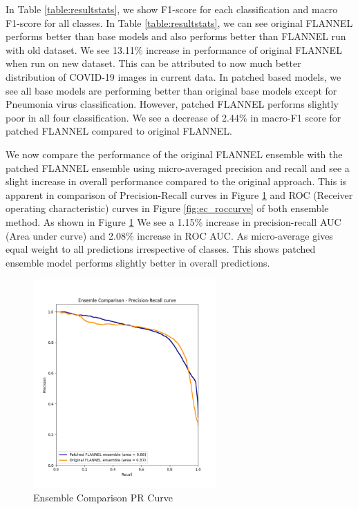 \documentclass{sigkddExp}
\begin{document}
In Table \ref{table:resultstats}, we show F1-score for each classification
and macro F1-score for all classes. In Table \ref{table:resultstats}, we can see
original FLANNEL performs better than base models and also performs better than
FLANNEL run with old dataset\cite{10.1093/jamia/ocaa280}. We see 13.11\% increase in performance of original
FLANNEL when run on new dataset. This can be attributed to now much better distribution
of COVID-19 images in current data. In patched based models, we see all base models
are performing better than original base models except for Pneumonia virus classification.
However, patched FLANNEL performs slightly poor in all four classification.
We see a decrease of 2.44\% in macro-F1 score for patched FLANNEL compared to
original FLANNEL.


We now compare the performance of the original FLANNEL ensemble with the patched
FLANNEL ensemble using micro-averaged precision and recall and see a slight
increase in overall performance compared to the original approach. This is
apparent in comparison of Precision-Recall curves in Figure \ref{fig:ec_prcurve}
and ROC (Receiver operating characteristic) curves in Figure
\ref{fig:ec_roccurve} of both ensemble method. As shown in Figure
\ref{fig:ec_prcurve} We see a 1.15\% increase in precision-recall AUC (Area
under curve) and 2.08\% increase in ROC AUC. As micro-average gives equal weight
to all predictions irrespective of classes. This shows patched ensemble model
performs slightly better in overall predictions.


\begin{figure}[h]
    \centering
    \includegraphics[width=7cm]{../doc/images/ensemble_comparison_precision_recall_curve.png}
    \caption{Ensemble Comparison PR Curve}
    \label{fig:ec_prcurve}
\end{figure}
\end{document}
